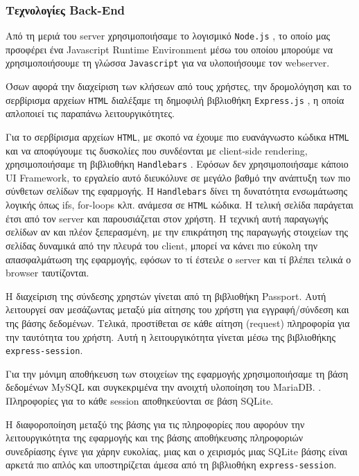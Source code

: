 \documentclass[acmtog, nonacm, language=english, language=greek]{acmart}
\newcommand{\en}[1]{\textlatin{#1}}
\newcommand{\src}[1]{\texttt{\en{#1}}}
\begin{document}
\subsubsection{Τεχνολογίες \en{Back-End}}

Από τη μεριά του \en{server} χρησιμοποιήσαμε
το λογισμικό \src{Node.js} \cite{Node.js}, 
το οποίο μας πρσοφέρει ένα \en{Javascript Runtime Environment} μέσω 
του οποίου μπορούμε να χρησιμοποιήσουμε τη γλώσσα \src{Javascript} 
για να υλοποιήσουμε τον \en{webserver}.

Όσων αφορά την διαχείριση των κλήσεων από τους χρήστες, την δρομολόγηση 
και το σερβίρισμα αρχείων \src{HTML} διαλέξαμε τη δημοφιλή 
βιβλιοθήκη \src{Express.js} \cite{Express}, η οποία απλοποιεί 
τις παραπάνω λειτουργικότητες. 

Για το σερβίρισμα αρχείων \src{HTML}, με σκοπό να έχουμε 
πιο ευανάγνωστο κώδικα \src{HTML} και να αποφύγουμε τις δυσκολίες 
που συνδέονται με \en{client-side rendering}, χρησιμοποιήσαμε 
τη βιβλιοθήκη \src{Handlebars} \cite{Handlebars}. Εφόσων δεν 
χρησιμοποιήσαμε κάποιο \en{UI Framework}, το εργαλείο αυτό διευκόλυνε 
σε μεγάλο βαθμό την ανάπτυξη των πιο σύνθετων σελίδων της εφαρμογής.
Η \src{Handlebars} δίνει τη δυνατότητα ενσωμάτωσης λογικής 
όπως \en{ifs, for-loops} κλπ. ανάμεσα σε \src{HTML} κώδικα. 
Η τελική σελίδα παράγεται έτσι από τον \en{server} και παρουσιάζεται στον χρήστη.
Η τεχνική αυτή παραγωγής σελίδων αν και πλέον ξεπερασμένη, με την επικράτηση 
της παραγωγής στοιχείων της σελίδας δυναμικά από την πλευρά του \en{client}, μπορεί να κάνει 
πιο εύκολη την απασφαλμάτωση της εφαρμογής, εφόσων το τί έστειλε ο \en{server}
και τί βλέπει τελικά ο \en{browser} ταυτίζονται.

Η διαχείριση της σύνδεσης χρηστών γίνεται από τη βιβλιοθήκη \en{Passport}.
\cite{Passport} Αυτή λειτουργεί σαν μεσάζωντας μεταξύ μία αίτησης του χρήστη
για εγγραφή/σύνδεση και της βάσης δεδομένων. Τελικά, προστίθεται σε κάθε αίτηση
(\en{request}) πληροφορία για την ταυτότητα του χρήστη. Αυτή η λειτουργικότητα
γίνεται μέσω της βιβλιοθήκης \src{express-session}. 

Για την μόνιμη αποθήκευση των στοιχείων της εφαρμογής χρησιμοποιήσαμε τη
βάση δεδομένων \en{MySQL} και συγκεκριμένα την ανοιχτή υλοποίηση του
\en{MariaDB}. \cite{MariaDB}. Πληροφορίες για το κάθε \en{session} 
αποθηκεύονται σε βάση \en{SQLite}.

Η διαφοροποίηση μεταξύ της βάσης για τις πληροφορίες που αφορόυν την λειτουργικότητα της 
εφαρμογής και της βάσης αποθήκευσης πληροφοριών συνεδρίασης έγινε για χάρην ευκολίας, 
μιας και ο χειρισμός μιας \en{SQLite} βάσης είναι αρκετά πιο απλός και υποστηρίζεται
άμεσα από τη βιβλιοθήκη \src{express-session}.
\end{document}
